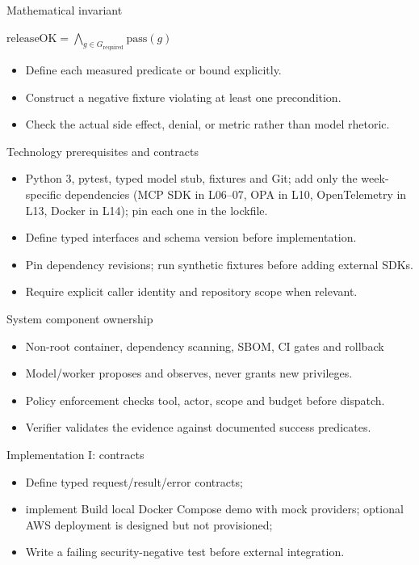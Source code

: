 \documentclass[aspectratio=169,10pt]{beamer}
\begin{document}
\begin{frame}{Mathematical invariant}
\small
\begin{center}\Large $\mathrm{releaseOK}=\bigwedge_{g\in G_{\mathrm{required}}}\mathrm{pass}(g)$\end{center}
\begin{itemize}
\item Define each measured predicate or bound explicitly.
\item Construct a negative fixture violating at least one precondition.
\item Check the actual side effect, denial, or metric rather than model rhetoric.
\end{itemize}

\end{frame}

\begin{frame}{Technology prerequisites and contracts}
\small
\begin{itemize}
\item Python 3, pytest, typed model stub, fixtures and Git; add only the week-specific dependencies (MCP SDK in L06--07, OPA in L10, OpenTelemetry in L13, Docker in L14); pin each one in the lockfile.
\item Define typed interfaces and schema version before implementation.
\item Pin dependency revisions; run synthetic fixtures before adding external SDKs.
\item Require explicit caller identity and repository scope when relevant.
\end{itemize}

\end{frame}

\begin{frame}{System component ownership}
\small
\begin{itemize}
\item Non-root container, dependency scanning, SBOM, CI gates and rollback
\item Model/worker proposes and observes, never grants new privileges.
\item Policy enforcement checks tool, actor, scope and budget before dispatch.
\item Verifier validates the evidence against documented success predicates.
\end{itemize}

\end{frame}

\begin{frame}{Implementation I: contracts}
\small
\begin{itemize}
\item Define typed request/result/error contracts;
\item implement Build local Docker Compose demo with mock providers; optional AWS deployment is designed but not provisioned;
\item Write a failing security-negative test before external integration.
\end{itemize}

\end{frame}
\end{document}
